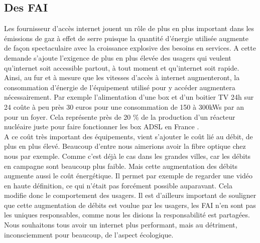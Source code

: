 \documentclass[a4paper,twocolumn,12pt]{article}
\begin{document}
\subsection{Des FAI}

	Les fournisseur d’accès internet jouent un rôle de plus en plus important dans les émissions de gaz à effet de serre puisque la quantité d'énergie utilisée augmente de façon spectaculaire avec la croissance explosive des besoins en services. A cette demande s’ajoute l’exigence de plus en plus élevée des usagers qui veulent qu’internet soit accessible partout, à tout moment et qu’internet soit rapide. Ainsi, au fur et à mesure que les vitesses d'accès à internet augmenteront, la consommation d'énergie de l'équipement utilisé pour y accéder augmentera nécessairement. Par exemple l’alimentation d’une box et d’un boitier TV 24h sur 24 coûte à peu près 30 euros pour une consommation de 150 à 300kWs par an pour un foyer. Cela représente près de 20 \% de la production d’un réacteur nucléaire juste pour faire fonctionner les box ADSL en France \cite{10}. \\

	A ce coût très important des équipements, vient s’ajouter le coût lié au débit, de plus en plus élevé. Beaucoup d’entre nous aimerions avoir la fibre optique chez nous par exemple. Comme c’est déjà le cas dans les grandes villes, car les débits en campagne sont beaucoup plus faible. Mais cette augmentation des débits augmente aussi le coût énergétique. Il permet par exemple de regarder une vidéo en haute définition, ce qui n’était pas forcément possible auparavant. Cela modifie donc le comportement des usagers. Il est d’ailleurs important de souligner que cette augmentation de débits est voulue par les usagers, les FAI n’en sont pas les uniques responsables, comme nous les disions la responsabilité est partagées. Nous souhaitons tous avoir un internet plus performant, mais au détriment, inconsciemment pour beaucoup, de l’aspect écologique. \\
\end{document}
